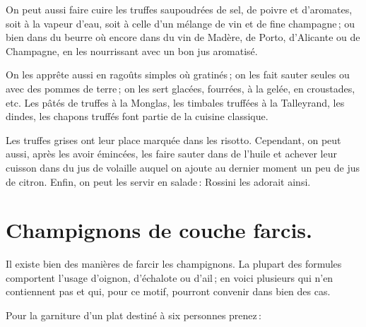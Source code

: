 On peut aussi faire cuire les truffes saupoudrées de sel, de poivre et
d'aromates, soit à la vapeur d'eau, soit à celle d'un mélange de vin et de fine
champagne ; ou bien dans du beurre où encore dans du vin de Madère, de Porto,
d'Alicante ou de Champagne, en les nourrissant avec un bon jus aromatisé.

On les apprête aussi en ragoûts simples où gratinés ; on les fait sauter seules
ou avec des pommes de terre ; on les sert glacées, fourrées, à la gelée, en
croustades, etc. Les pâtés de truffes à la Monglas, les timbales truffées à la
Talleyrand, les dindes, les chapons truffés font partie de la cuisine
classique.

Les truffes grises ont leur place marquée dans les risotto. Cependant, on peut
aussi, après les avoir émincées, les faire sauter dans de l'huile et achever
leur cuisson dans du jus de volaille auquel on ajoute au dernier moment un peu
de jus de citron. Enfin, on peut les servir en salade : Rossini les adorait
ainsi.

\section*{\centering Champignons de couche farcis.}
{}

Il existe bien des manières de farcir les champignons. La plupart des formules
comportent l'usage d'oignon, d'échalote ou d'ail ; en voici plusieurs qui n'en
contiennent pas et qui, pour ce motif, pourront convenir dans bien des cas.

\medskip

Pour la garniture d'un plat destiné à six personnes prenez :

